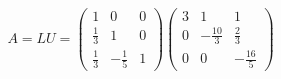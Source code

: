 \documentclass[preview]{standalone}
\begin{document}
\begin{align*}
A = L U = \begin{pmatrix}1 & 0 & 0 \\\frac{1}{3} & 1 & 0 \\\frac{1}{3} & -\frac{1}{5} & 1\end{pmatrix}\begin{pmatrix}3 & 1 & 1 \\0 & -\frac{10}{3} & \frac{2}{3} \\0 & 0 & -\frac{16}{5}\end{pmatrix}
\end{align*}
\end{document}
